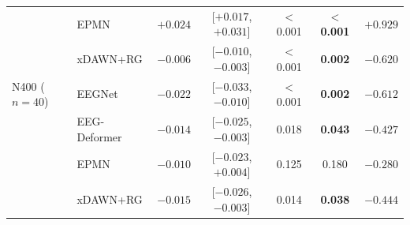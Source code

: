 \begin{table}[t]
\begin{tabular}{llccccc}
 & EPMN & $+0.024$ & [$+0.017$, $+0.031$] & $<$0.001 & \textbf{$<$0.001} & $+0.929$ \\
 & xDAWN+RG & $-0.006$ & [$-0.010$, $-0.003$] & $<$0.001 & \textbf{0.002} & $-0.620$ \\
\midrule
N400 ($n{=}40$) & EEGNet & $-0.022$ & [$-0.033$, $-0.010$] & $<$0.001 & \textbf{0.002} & $-0.612$ \\
 & EEG-Deformer & $-0.014$ & [$-0.025$, $-0.003$] & 0.018 & \textbf{0.043} & $-0.427$ \\
 & EPMN & $-0.010$ & [$-0.023$, $+0.004$] & 0.125 & 0.180 & $-0.280$ \\
 & xDAWN+RG & $-0.015$ & [$-0.026$, $-0.003$] & 0.014 & \textbf{0.038} & $-0.444$ \\
\bottomrule
\end{tabular}
\end{table}
